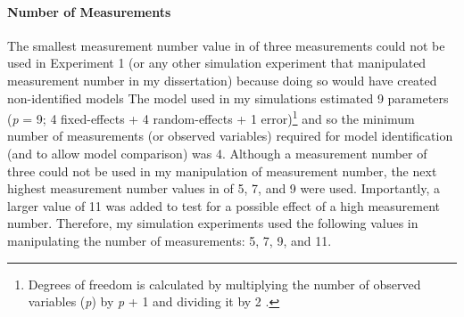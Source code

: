 \documentclass[
12pt, %
twoside,
english]{guelphthesis}
\begin{document}
\hypertarget{number-measurements}{%
\paragraph{Number of Measurements}\label{number-measurements}}

The smallest measurement number value in \textcite{coulombe2016} of three measurements could not be used in Experiment 1 (or any other simulation experiment that manipulated measurement number in my dissertation) because doing so would have created non-identified models The model used in my simulations estimated 9 parameters (\emph{p} = 9; 4 fixed-effects + 4 random-effects + 1 error)\footnote{Degrees of freedom is calculated by multiplying the number of observed variables (\textit{p}) by \textit{p} + 1 and dividing it by 2 \parencite[$\frac{p [p+1]}{2}$;][]{loehlin2017}.} and so the minimum number of measurements (or observed variables) required for model identification (and to allow model comparison) was 4. Although a measurement number of three could not be used in my manipulation of measurement number, the next highest measurement number values in \textcite{coulombe2016} of 5, 7, and 9 were used. Importantly, a larger value of 11 was added to test for a possible effect of a high measurement number. Therefore, my simulation experiments used the following values in manipulating the number of measurements: 5, 7, 9, and 11.
\end{document}
